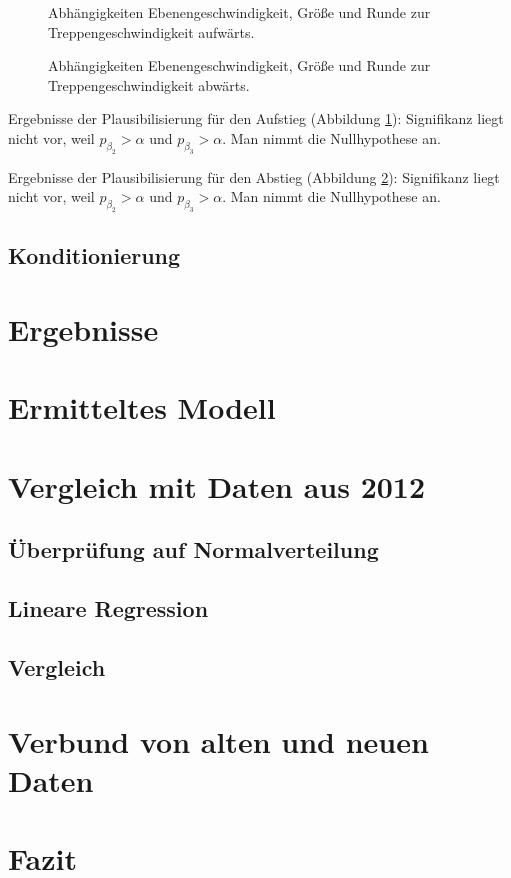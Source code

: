 \begin{figure} \centering 
	
	\caption{Abhängigkeiten Ebenengeschwindigkeit, Größe und Runde zur Treppengeschwindigkeit aufwärts.
	\label{fig:auf-ebene-groesse-runde}}
\end{figure}

\begin{figure} \centering 
	
	\caption{Abhängigkeiten Ebenengeschwindigkeit, Größe und Runde zur Treppengeschwindigkeit abwärts.
	\label{fig:ab-ebene-groesse-runde}}
\end{figure}

Ergebnisse der Plausibilisierung für den Aufstieg
(Abbildung \ref{fig:auf-ebene-groesse-runde}):
Signifikanz liegt nicht vor, weil $p_{\beta_2} > \alpha$ und $p_{\beta_3} > \alpha$. Man nimmt die Nullhypothese an.

Ergebnisse der Plausibilisierung für den Abstieg
(Abbildung \ref{fig:ab-ebene-groesse-runde}):
Signifikanz liegt nicht vor, weil $p_{\beta_2} > \alpha$ und $p_{\beta_3} > \alpha$. Man nimmt die Nullhypothese an.

\subsection{Konditionierung}

\section{Ergebnisse}
\section{Ermitteltes Modell}

\section{Vergleich mit Daten aus 2012}
\subsection{Überprüfung auf Normalverteilung}
\subsection{Lineare Regression}
\subsection{Vergleich}

\section{Verbund von alten und neuen Daten}

\section{Fazit}

